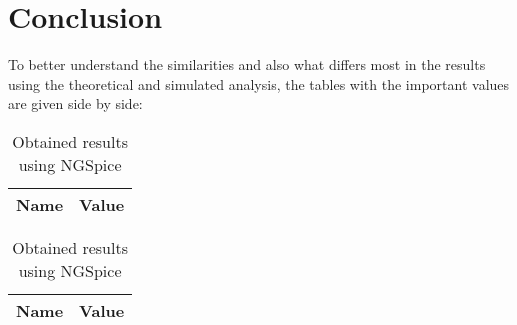 \section{Conclusion}
\label{sec:conclusion}

\par To better understand the similarities and also what differs most in the results using the theoretical and simulated analysis, the tables with the important values are given side by side:

\begin{table}[ht]
\parbox{.55\linewidth}{
  \centering
  \begin{tabular}{|l|r|}
    \hline    
    {\bf Name} & {\bf Value} \\ \hline
    
  \end{tabular}
  \caption{Obtained results using Octave}} 
\parbox{.55\linewidth}{
 \centering
  \begin{tabular}{|l|r|}
    \hline    
    {\bf Name} & {\bf Value} \\ \hline
    
  \end{tabular}
  \caption{Obtained results using NGSpice}}
\end{table}

